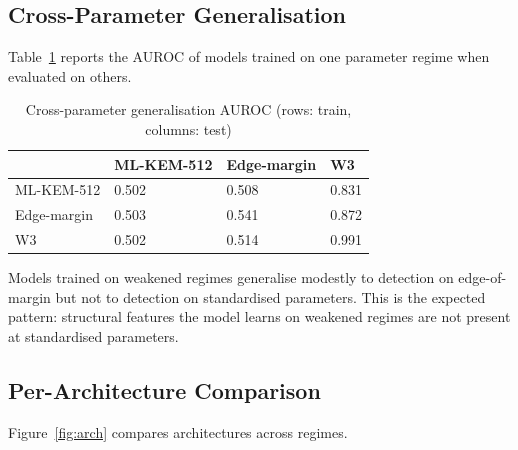 \documentclass[sigconf,nonacm]{acmart}
\begin{document}
\subsection{Cross-Parameter Generalisation}

Table~\ref{tab:transfer} reports the AUROC of models trained on one
parameter regime when evaluated on others.

\begin{table}[h]
\caption{Cross-parameter generalisation AUROC (rows: train, columns:
test)}
\label{tab:transfer}
\small
\begin{tabularx}{\columnwidth}{@{}p{1.8cm}X X X@{}}
\toprule
& \textbf{ML-KEM-512} & \textbf{Edge-margin} & \textbf{W3} \\
\midrule
ML-KEM-512    & 0.502 & 0.508 & 0.831 \\
Edge-margin   & 0.503 & 0.541 & 0.872 \\
W3            & 0.502 & 0.514 & 0.991 \\
\bottomrule
\end{tabularx}
\end{table}

Models trained on weakened regimes generalise modestly to detection
on edge-of-margin but not to detection on standardised parameters.
This is the expected pattern: structural features the model learns
on weakened regimes are not present at standardised parameters.

\subsection{Per-Architecture Comparison}

Figure~\ref{fig:arch} compares architectures across regimes.
\end{document}
